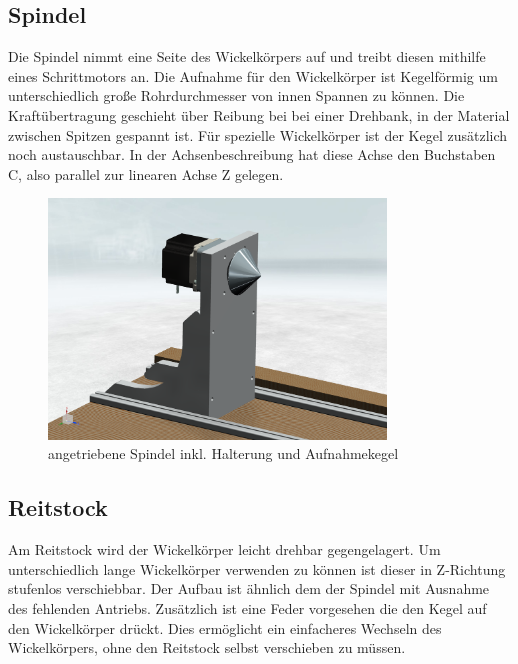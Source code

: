 \documentclass[paper=A4,pagesize,DIV=18, 12pt,listof=totoc,bibliography=totoc,headings=optiontohead,open=any]{article}
\begin{document}
\subsection{Spindel}
Die Spindel nimmt eine Seite des Wickelkörpers auf und treibt diesen mithilfe eines Schrittmotors an. Die Aufnahme für den Wickelkörper ist Kegelförmig um unterschiedlich große Rohrdurchmesser von innen Spannen zu können. Die Kraftübertragung geschieht über Reibung bei bei einer Drehbank, in der Material zwischen Spitzen gespannt ist. Für spezielle Wickelkörper ist der Kegel zusätzlich noch austauschbar. In der Achsenbeschreibung hat diese Achse den Buchstaben C, also parallel zur linearen Achse Z gelegen.

\begin{figure}[H]
	\centering
	\includegraphics[width=0.8\textwidth]{NX_Screenshots/spindel.png}
	\caption{angetriebene Spindel inkl. Halterung und Aufnahmekegel} 
	\label{fig:spindel}
\end{figure}

\subsection{Reitstock}
Am Reitstock wird der Wickelkörper leicht drehbar gegengelagert. Um unterschiedlich lange Wickelkörper verwenden zu können ist dieser in Z-Richtung stufenlos verschiebbar. Der Aufbau ist ähnlich dem der Spindel mit Ausnahme des fehlenden Antriebs. Zusätzlich ist eine Feder vorgesehen die den Kegel auf den Wickelkörper drückt. Dies ermöglicht ein einfacheres Wechseln des Wickelkörpers, ohne den Reitstock selbst verschieben zu müssen.
\end{document}

